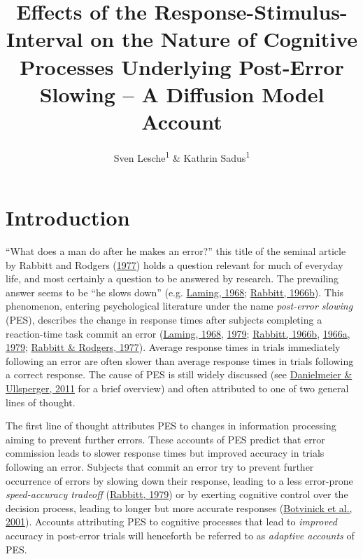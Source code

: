 \documentclass[
  man,floatsintext]{apa7}
\title{Effects of the Response-Stimulus-Interval on the Nature of Cognitive Processes Underlying Post-Error Slowing -- A Diffusion Model Account}
\author{Sven Lesche\textsuperscript{1} \& Kathrin Sadus\textsuperscript{1}}
\date{}
\affiliation{\vspace{0.5cm}\textsuperscript{1} Ruprecht-Karls-University Heidelberg}
\begin{document}
\maketitle

\hypertarget{introduction}{%
\section{Introduction}\label{introduction}}

``What does a man do after he makes an error?'' this title of the seminal article by Rabbitt and Rodgers (\protect\hyperlink{ref-rabbitt1977}{1977}) holds a question relevant for much of everyday life, and most certainly a question to be answered by research. The prevailing answer seems to be ``he slows down'' (e.g. \protect\hyperlink{ref-laming1968}{Laming, 1968}; \protect\hyperlink{ref-rabbitt1966a}{Rabbitt, 1966b}). This phenomenon, entering psychological literature under the name \emph{post-error slowing} (PES), describes the change in response times after subjects completing a reaction-time task commit an error (\protect\hyperlink{ref-laming1968}{Laming, 1968}, \protect\hyperlink{ref-laming1979}{1979}; \protect\hyperlink{ref-rabbitt1966a}{Rabbitt, 1966b}, \protect\hyperlink{ref-rabbitt1966b}{1966a}, \protect\hyperlink{ref-rabbitt1979}{1979}; \protect\hyperlink{ref-rabbitt1977}{Rabbitt \& Rodgers, 1977}). Average response times in trials immediately following an error are often slower than average response times in trials following a correct response. The cause of PES is still widely discussed (see \protect\hyperlink{ref-danielmeier2011}{Danielmeier \& Ullsperger, 2011} for a brief overview) and often attributed to one of two general lines of thought.

The first line of thought attributes PES to changes in information processing aiming to prevent further errors. These accounts of PES predict that error commission leads to slower response times but improved accuracy in trials following an error. Subjects that commit an error try to prevent further occurrence of errors by slowing down their response, leading to a less error-prone \emph{speed-accuracy tradeoff} (\protect\hyperlink{ref-rabbitt1979}{Rabbitt, 1979}) or by exerting cognitive control over the decision process, leading to longer but more accurate responses (\protect\hyperlink{ref-botvinick2001}{Botvinick et al., 2001}). Accounts attributing PES to cognitive processes that lead to \emph{improved} accuracy in post-error trials will henceforth be referred to as \emph{adaptive accounts} of PES.
\end{document}
